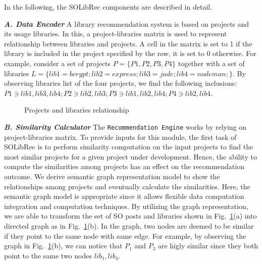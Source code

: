\documentclass[paper]{ieice}
\begin{document}

In the following, the SOLibRec components are described in detail. 


 

\textit{\textbf{A. Data Encoder}}
A library recommendation system is based on projects and its usage libraries. In this, a project-libraries matrix is used to represent relationship between libraries and projects. A cell in the matrix is set to 1 if the library is included in the project specified by the row, it is set to 0 otherwise. For example, consider a set of projects $P=\{P1, P2, P3, P4\}$ together with a set of libraries $L=\{lib1=bcrypt; lib2=express; lib3=jade; lib4=nodeman;\}$. By observing libraries list of the four projects, we find the following inclusions: $P1\ni lib1, lib3, lib4; P2\ni lib2, lib3; P3\ni lib1, lib2, lib4; P4\ni lib2, lib4$.

\begin{figure}[ht]
\hfill
{}
\hfill
{}
\hfill
\caption{Projects and libraries relationship}
	\label{fig:method1}
\end{figure}

\textit{\textbf{B. Similarity Calculator}}
The \texttt{Recommendation Engine} works by  relying on project-libraries matrix. To provide inputs for this module, the first task of SOLibRec is to perform similarity computation on the input projects to find the most similar projects for a given project under development. Hence, the ability to compute the similarities among projects has an effect on the recommendation outcome. We derive semantic graph representation model to show the relationships among projects and eventually calculate the similarities. Here, the semantic graph model is appropriate since it allows flexible data computation integration and computation techniques. By utilizing the graph representation, we are able to transform the set of SO posts and libraries shown in Fig.~\ref{fig:method1}(a) into directed graph as in Fig.~\ref{fig:method1}(b). 
In the graph, two nodes are deemed to be similar if they point to the same node with same edge. For example, by observing the graph in Fig.~\ref{fig:method1}(b), we can notice that $P_1$ and $P_3$ are higly similar since they both point to the same two nodes $lib_1, lib_4$. 
\end{document}
